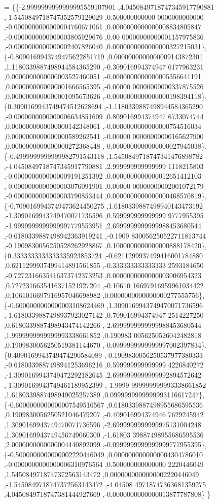 \begin{DoxyCode}
= \{\{-2.9999999999999995559107901 ,4.0450849718747345917790881 ,-1.5450849718747352579129029 ,0.500000000000
      0000000000000 ,-0.0000000000000004760671061 ,0.0000000000000008834805847 ,-0.0000000000000003805929676 ,0.00
      00000000000001157975836 ,-0.0000000000000002407826040 ,0.0000000000000000327215031\},
\{-0.8090169943749475622851719 ,0.0000000000000009143872301 ,1.1180339887498944584365290 ,-0.309016994374947
      6177963231 ,0.0000000000000003527460051 ,-0.0000000000000005356641191 ,0.0000000000000001666565395 ,-0.00000
      00000000000337875526 ,0.0000000000000001095673626 ,-0.0000000000000000198394118\},
\{0.3090169943749474512628694 ,-1.1180339887498944584365290 ,-0.0000000000000006634851609 ,0.809016994374947
      6733074744 ,0.0000000000000000142348061 ,-0.0000000000000000754516034 ,0.0000000000000000589262541 ,-0.00000
      00000000000165627900 ,0.0000000000000000272368448 ,-0.0000000000000000027945038\},
\{-0.4999999999999982791543118 ,1.5450849718747341476898782 ,-4.0450849718747345917790881 ,2.999999999999999
      1118215803 ,-0.0000000000000009191251392 ,0.0000000000000012651412103 ,-0.0000000000000003076091901 ,0.00000
      00000000002001072179 ,-0.0000000000000003790853444 ,0.0000000000000000468570819\},
\{-0.7090169943749473624450275 ,1.6180339887498940143473192 ,-1.3090169943749470071736596 ,0.599999999999999
      9777955395 ,-1.9999999999999997779553951 ,2.6999999999999988453680544 ,-0.6180339887498942363919241 ,-0.1909
      830056250522711813744 ,-0.1909830056250528262928867 ,0.1000000000000000888178420\},
\{0.3333333333333335923853724 ,-0.6211299937499416001784880 ,0.6211299937499414891561855 ,-0.333333333333333
      2593184650 ,-0.7272316635416373742373253 ,0.0000000000000003006954323 ,0.7272316635416371521927204 ,-0.10610
      16697916959961034422 ,0.1061016697916957046698982 ,0.0000000000000000277555756\},
\{-0.6000000000000003108624469 ,1.3090169943749470071736596 ,-1.6180339887498937923027142 ,0.709016994374947
      2514227250 ,0.6180339887498943474142266 ,-2.6999999999999988453680544 ,1.9999999999999993338661852 ,0.190983
      0056250526042482818 ,0.1909830056250519381144670 ,-0.0999999999999997002397834\},
\{0.4090169943749474290584089 ,-0.1909830056250537977380333 ,-0.6180339887498941253696216 ,0.599999999999999
      4226840272 ,-1.3090169943749472292182645 ,2.6999999999999992894572642 ,-1.3090169943749461189952399 ,-1.9999
      999999999993338661852 ,1.6180339887498949025257389 ,0.0999999999999993116617247\},
\{-0.6000000000000007549516567 ,0.6180339887498955686595536 ,0.1909830056250521046479207 ,-0.409016994374946
      7629245942 ,1.3090169943749470071736596 ,-2.6999999999999975131004248 ,1.3090169943749456749060300 ,-1.61803
      39887498955686595536 ,2.0000000000000004440892099 ,-0.0999999999999999777955395\},
\{-0.5000000000000002220446049 ,0.0000000000000004304786010 ,-0.0000000000000006310976564 ,0.500000000000000
      2220446049 ,1.5450849718747372563143472 ,0.0000000000000002220446049 ,-1.5450849718747372563143472 ,-4.04508
      49718747363681359275 ,4.0450849718747381444927669 ,-0.0000000000000013877787808\}
\}
\end{DoxyCode}
